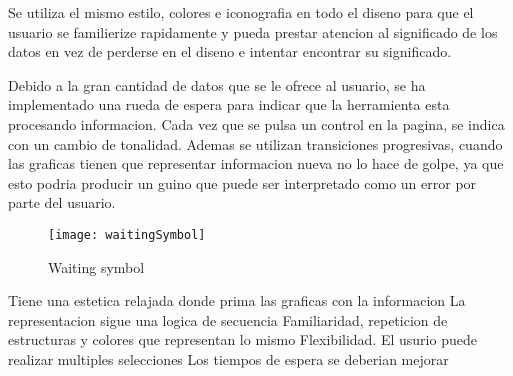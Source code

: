 Se utiliza el mismo estilo, colores e iconografia en todo el diseno para que el usuario se familierize rapidamente y pueda
prestar atencion al significado de los datos en vez de perderse en el diseno e intentar encontrar su significado. 

Debido a la gran cantidad de datos que se le ofrece al usuario, se ha implementado una rueda de espera para indicar
que la herramienta esta procesando informacion. Cada vez que se pulsa un control en la pagina, se indica con un cambio
de tonalidad. Ademas se utilizan transiciones progresivas, cuando las graficas tienen que representar informacion nueva no lo hace 
de golpe, ya que esto podria producir un guino que puede ser interpretado como un error por parte del usuario.



\begin{figure}[ht]
    \centering
    \texttt{[image: waitingSymbol]}
    \caption{Waiting symbol}
\end{figure}
\newpage
{}  
\begin{itemize}
    \done Tiene una estetica relajada donde prima las graficas con la informacion
    \done La representacion sigue una logica de secuencia
    \done Familiaridad, repeticion de estructuras y colores que representan lo mismo
    \done Flexibilidad. El usurio puede realizar multiples selecciones
    \crossed Los tiempos de espera se deberian mejorar
\end{itemize}
\newpage